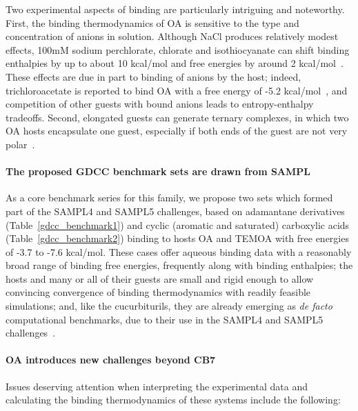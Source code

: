 \documentclass[aps,pre,twocolumn,nofootinbib,superscriptaddress,10pt, final,tightenlines]{revtex4-1}
\begin{document}
Two experimental aspects of binding are particularly intriguing and noteworthy. 
First, the binding thermodynamics of OA is sensitive to the type and concentration of anions in solution. 
Although NaCl produces relatively modest effects, 100mM sodium perchlorate, chlorate and isothiocyanate can shift binding enthalpies by up to about 10 kcal/mol and free energies by around 2 kcal/mol~\cite{gibb_anion_2011}. 
These effects are due in part to binding of anions by the host; indeed, trichloroacetate is reported to bind OA with a free energy of -5.2 kcal/mol~\cite{sokkalingam_binding_2016}, and competition of other guests with bound anions leads to entropy-enthalpy tradeoffs. 
Second, elongated guests can generate ternary complexes, in which two OA hosts encapsulate one guest, especially if both ends of the guest are not very polar~\cite{gibb_guests_2009}.  

\paragraph{The proposed GDCC benchmark sets are drawn from SAMPL}
As a core benchmark series for this family, we propose two sets which formed part of the SAMPL4 and SAMPL5 challenges, based on adamantane derivatives (Table~\ref{gdcc_benchmark1}) and cyclic (aromatic and saturated) carboxylic acids (Table~\ref{gdcc_benchmark2}) binding to hosts OA and TEMOA with free energies of -3.7 to -7.6 kcal/mol. These cases offer aqueous binding data with a reasonably broad range of binding free energies, frequently along with binding enthalpies; the hosts and many or all of their guests are small and rigid enough to allow convincing convergence of binding thermodynamics with readily feasible simulations; and, like the cucurbiturils, they are already emerging as \emph{de facto} computational benchmarks, due to their use in the SAMPL4 and SAMPL5 challenges~\cite{muddana_sampl4_2014, yin_sampl5_preprint}. 

\paragraph{OA introduces new challenges beyond CB7} Issues deserving attention when interpreting the experimental data and calculating the binding thermodynamics of these systems include the following:
\end{document}
